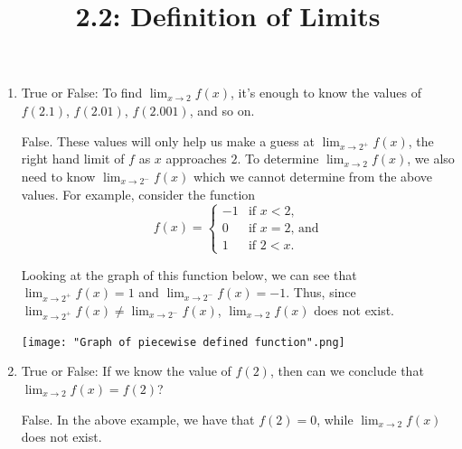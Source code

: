 \documentclass[nooutcomes,handout]{ximera}
\title{2.2:  Definition of Limits}
\begin{document}
\begin{abstract}		\end{abstract}
\maketitle

\begin{problem} \hfil
	\begin{enumerate}

	\item  True or False: To find $\lim_{x \to 2} f(x)$, it's enough to know the values of $f(2.1)$, $f(2.01)$, $f(2.001)$, and so on.
	\begin{freeResponse}
	 False.  These values will only help us make a guess at $\lim_{x \to 2^+} f(x)$, the right hand limit of $f$ as $x$ approaches $2$.  To determine $\lim_{x \to 2} f(x)$, we also need to know $\lim_{x \to 2^-} f(x)$ which we cannot determine from the above values.  For example, consider the function
	 	        \[
          f(x) =
        \begin{cases}
         -1 & \mbox{if $x < 2$,}\\
          0 & \mbox{if $x = 2$, and}\\
          1 & \mbox{if $2 < x$.}
        \end{cases}
        \]

	Looking at the graph of this function below, we can see that $\lim_{x \to 2^+} f(x) = 1$ and $\lim_{x \to 2^-} f(x) = -1$.  Thus, since $\lim_{x \to 2^+} f(x) \neq \lim_{x \to 2^-} f(x)$, $\lim_{x \to 2} f(x)$ does not exist.
	
		\begin{image}
          \texttt{[image: "Graph of piecewise defined function".png]}
		\end{image}
	\end{freeResponse}
	
	
	
	\item  True or False: If we know the value of $f(2)$, then can we conclude that $\lim_{x \to 2} f(x)=f(2)$?
		\begin{freeResponse}
		False.  In the above example, we have that $f(2) = 0$, while $\lim_{x \to 2} f(x)$ does not exist.
		\end{freeResponse}
	\end{enumerate}


\end{problem}
\end{document}
